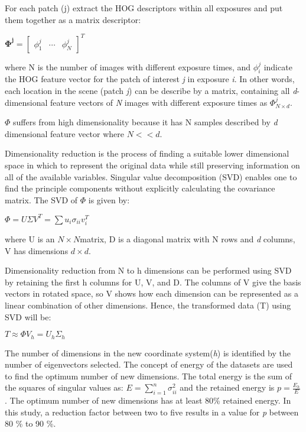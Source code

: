 \documentclass[preprint,12pt,3p]{elsarticle}
\begin{document}
For each patch (j) extract the HOG descriptors within all exposures and put them together as a matrix descriptor: 
\begin{center}
$\mathbf{\Phi^{j}} = \begin{bmatrix}
  \phi_{1}^{j} & \cdots & \phi_{N}^{j}
 \end{bmatrix}^{T}
 $\\
\end{center}
 where N is the number of images with different exposure times, and $\phi_{i}^{j}$ indicate the HOG feature vector for the patch of interest \textit{j} in exposure \textit{i}. In other words, each location in the scene (patch \textit{j}) can be describe by a matrix, containing all \textit{d}-dimensional feature vectors of \textit{N} images with different exposure times as $\Phi_{N\times d}^{j}$.  
 
 $\Phi$  suffers from high dimensionality because it has N samples described by \textit{d} dimensional feature vector where $N<<\textit{d}$.
 
Dimensionality reduction is the process of finding a suitable lower dimensional space in which to represent the original data while still preserving information on all of the available variables. Singular value decomposition (SVD) enables one to find the principle components without explicitly calculating the covariance matrix. The SVD of $\Phi$ is given by: \cite{17}

\begin{center}
$ \Phi = U\varSigma V^{T} = \sum{u_{i}\sigma_{ii}v_{i}^{T}}$
\end{center}
where U is an $N \times N $matrix, D is a diagonal matrix with N rows and \textit{d} columns,
V has dimensions $d \times d$.
 
Dimensionality reduction from N to h dimensions can be performed using SVD by retaining the first h columns for U, V, and D. The columns of V give the basis vectors in rotated space, so V shows how each dimension can be represented as a linear combination of other dimensions. Hence, the transformed data (T) using SVD will be: 
\begin{center}
$T \approx \Phi V_{h} = U_{h}\varSigma_{h}$
\end{center}
The number of dimensions in the new coordinate system(\textit{h}) is identified by the number of eigenvectors selected. The concept of energy of the datasets are used to find the optimum number of new dimensions. The total energy is the sum of the squares of singular values as:
$ E = \sum_{i=1}^{n} \sigma_{ii}^{2} $ and the retained energy  is $p = \frac{E_{h}}{E}$.
The optimum number of new dimensions has at least 80\% retained energy. In this study, a reduction factor between two to five results in a value for \textit{p} between 80 \% to 90 \%.
\end{document}
